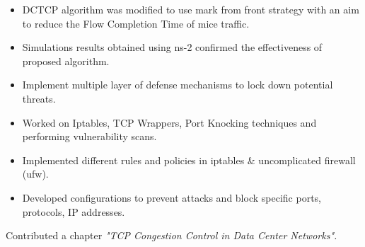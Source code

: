 \documentclass[10pt,a4paper]{altacv}
\begin{document}
\begin{itemize}

\item DCTCP algorithm was modified to use mark from front strategy with an aim to reduce the Flow Completion Time of mice traffic.
\item Simulations results obtained using ns-2 confirmed the effectiveness of proposed algorithm.
\end{itemize}

\begin{itemize}

\item Implement multiple layer of defense mechanisms to lock down potential threats.
\item Worked on Iptables, TCP Wrappers, Port Knocking techniques and performing vulnerability scans.
\end{itemize}

\begin{itemize}
\item Implemented different rules and policies in iptables \& uncomplicated firewall (ufw).
\item Developed configurations to prevent attacks and block specific ports,
protocols, IP addresses.
\end{itemize}

\divider



\divider\smallskip


\divider\smallskip




\clearpage


\nocite{*}

\printbibliography[heading=pubtype,title={\printinfo{\faBook}{Books}},type=book]

Contributed a chapter \emph{"TCP Congestion Control in Data Center Networks".}
\divider

\printbibliography[heading=pubtype,title={\printinfo{\faGroup}{Conference Proceedings}},type=inproceedings]

\end{document}
